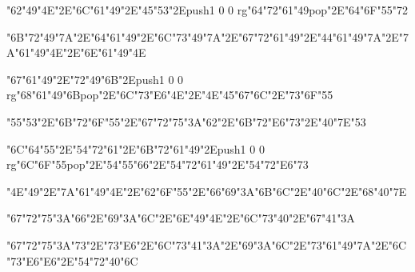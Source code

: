 \vfill\eject
\null\vfill
\centerline{\ipa\char"62\ipa\char"49\ipa\char"4E\ipa\char"2E\ipa\char"6C\ipa\char"61\ipa\char"49\ipa\char"2E\ipa\char"45\ipa\char"53\ipa\char"2E\pdfcolorstack\match push{1 0 0 rg}\ipa\char"64\ipa\char"72\ipa\char"61\ipa\char"49\pdfcolorstack\match pop{}\ipa\char"2E\ipa\char"64\ipa\char"6F\ipa\char"55\ipa\char"72}\bigskip
\centerline{\ipa\char"6B\ipa\char"72\ipa\char"49\ipa\char"7A\ipa\char"2E\ipa\char"64\ipa\char"61\ipa\char"49\ipa\char"2E\ipa\char"6C\ipa\char"73\ipa\char"49\ipa\char"7A\ipa\char"2E\ipa\char"67\ipa\char"72\ipa\char"61\ipa\char"49\ipa\char"2E\ipa\char"44\ipa\char"61\ipa\char"49\ipa\char"7A\ipa\char"2E\ipa\char"7A\ipa\char"61\ipa\char"49\ipa\char"4E\ipa\char"2E\ipa\char"6E\ipa\char"61\ipa\char"49\ipa\char"4E}\bigskip
\centerline{\ipa\char"67\ipa\char"61\ipa\char"49\ipa\char"2E\ipa\char"72\ipa\char"49\ipa\char"6B\ipa\char"2E\pdfcolorstack\match push{1 0 0 rg}\ipa\char"68\ipa\char"61\ipa\char"49\ipa\char"6B\pdfcolorstack\match pop{}\ipa\char"2E\ipa\char"6C\ipa\char"73\ipa\char"E6\ipa\char"4E\ipa\char"2E\ipa\char"4E\ipa\char"45\ipa\char"67\ipa\char"6C\ipa\char"2E\ipa\char"73\ipa\char"6F\ipa\char"55}
\vfill\eject
\null\vfill
\centerline{\ipa\char"55\ipa\char"53\ipa\char"2E\ipa\char"6B\ipa\char"72\ipa\char"6F\ipa\char"55\ipa\char"2E\ipa\char"67\ipa\char"72\ipa\char"75\ipa\char"3A\ipa\char"62\ipa\char"2E\ipa\char"6B\ipa\char"72\ipa\char"E6\ipa\char"73\ipa\char"2E\ipa\char"40\ipa\char"7E\ipa\char"53}\bigskip
\centerline{\ipa\char"6C\ipa\char"64\ipa\char"55\ipa\char"2E\ipa\char"54\ipa\char"72\ipa\char"61\ipa\char"2E\ipa\char"6B\ipa\char"72\ipa\char"61\ipa\char"49\ipa\char"2E\pdfcolorstack\match push{1 0 0 rg}\ipa\char"6C\ipa\char"6F\ipa\char"55\pdfcolorstack\match pop{}\ipa\char"2E\ipa\char"54\ipa\char"55\ipa\char"66\ipa\char"2E\ipa\char"54\ipa\char"72\ipa\char"61\ipa\char"49\ipa\char"2E\ipa\char"54\ipa\char"72\ipa\char"E6\ipa\char"73}\bigskip
\centerline{\ipa\char"4E\ipa\char"49\ipa\char"2E\ipa\char"7A\ipa\char"61\ipa\char"49\ipa\char"4E\ipa\char"2E\ipa\char"62\ipa\char"6F\ipa\char"55\ipa\char"2E\ipa\char"66\ipa\char"69\ipa\char"3A\ipa\char"6B\ipa\char"6C\ipa\char"2E\ipa\char"40\ipa\char"6C\ipa\char"2E\ipa\char"68\ipa\char"40\ipa\char"7E}
\vfill\eject
\null\vfill
\centerline{\ipa\char"67\ipa\char"72\ipa\char"75\ipa\char"3A\ipa\char"66\ipa\char"2E\ipa\char"69\ipa\char"3A\ipa\char"6C\ipa\char"2E\ipa\char"6E\ipa\char"49\ipa\char"4E\ipa\char"2E\ipa\char"6C\ipa\char"73\ipa\char"40\ipa\char"2E\ipa\char"67\ipa\char"41\ipa\char"3A}\bigskip
\centerline{\ipa\char"67\ipa\char"72\ipa\char"75\ipa\char"3A\ipa\char"73\ipa\char"2E\ipa\char"73\ipa\char"E6\ipa\char"2E\ipa\char"6C\ipa\char"73\ipa\char"41\ipa\char"3A\ipa\char"2E\ipa\char"69\ipa\char"3A\ipa\char"6C\ipa\char"2E\ipa\char"73\ipa\char"61\ipa\char"49\ipa\char"7A\ipa\char"2E\ipa\char"6C\ipa\char"73\ipa\char"E6\ipa\char"E6\ipa\char"2E\ipa\char"54\ipa\char"72\ipa\char"40\ipa\char"6C}\bigskip
